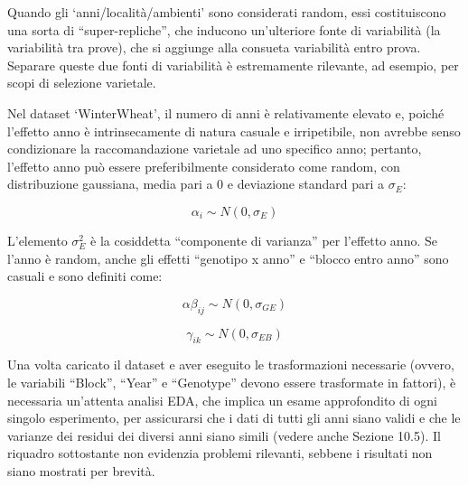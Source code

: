 \documentclass[
  12pt,
]{book}
\begin{document}
Quando gli `anni/località/ambienti' sono considerati random, essi costituiscono una sorta di ``super-repliche'', che inducono un'ulteriore fonte di variabilità (la variabilità tra prove), che si aggiunge alla consueta variabilità entro prova. Separare queste due fonti di variabilità è estremamente rilevante, ad esempio, per scopi di selezione varietale.

Nel dataset `WinterWheat', il numero di anni è relativamente elevato e, poiché l'effetto anno è intrinsecamente di natura casuale e irripetibile, non avrebbe senso condizionare la raccomandazione varietale ad uno specifico anno; pertanto, l'effetto anno può essere preferibilmente considerato come random, con distribuzione gaussiana, media pari a 0 e deviazione standard pari a \(\sigma_E\):

\[\alpha_i \sim N(0, \sigma_E)\]

L'elemento \(\sigma^2_E\) è la cosiddetta ``componente di varianza'' per l'effetto anno. Se l'anno è random, anche gli effetti ``genotipo x anno'' e ``blocco entro anno'' sono casuali e sono definiti come:

\[\alpha\beta_{ij} \sim N(0, \sigma_{GE})\]

\[\gamma_{ik} \sim N(0, \sigma_{EB})\]

Una volta caricato il dataset e aver eseguito le trasformazioni necessarie (ovvero, le variabili ``Block'', ``Year'' e ``Genotype'' devono essere trasformate in fattori), è necessaria un'attenta analisi EDA, che implica un esame approfondito di ogni singolo esperimento, per assicurarsi che i dati di tutti gli anni siano validi e che le varianze dei residui dei diversi anni siano simili (vedere anche Sezione 10.5). Il riquadro sottostante non evidenzia problemi rilevanti, sebbene i risultati non siano mostrati per brevità.
\end{document}
